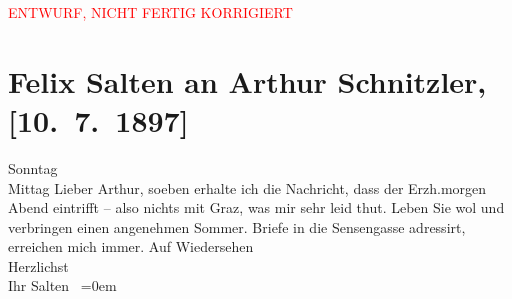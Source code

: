 
\begin{center}
            \textcolor{red}{ENTWURF, NICHT FERTIG KORRIGIERT}
                      \end{center}
            
         
         \renewcommand{\erwaehntePersonen}{Personen: Leopold Ferdinand Salvator Wölfling}
         \renewcommand{\erwaehnteOrte}{Orte: Graz, Sensengasse, Wien}
         \renewcommand{\erwaehnteWerke}{}
               \section[Felix Salten an Arthur Schnitzler, {[}10. 7. 1897{]}]{ Felix Salten an Arthur Schnitzler, {[}10. 7. 1897{]}}\nopagebreak{}\rehead{ }\begin{ledgroupsized}[t]{13cm}\normalsize\beginnumbering \toendnotes[C]{\smallbreak\pagebreak[2]} 
\toendnotes[C]{\smallbreak}\pstart
           \raggedleft{}{\pb}Sonntag{\\}Mittag\pend
           \pstart
           Lieber Arthur, soeben erhalte ich die Nachricht, dass der Erzh.morgen Abend eintrifft – also nichts mit Graz, was mir sehr leid thut. Leben Sie wol und verbringen einen angenehmen
               Sommer. Briefe in die Sensengasse adressirt,
               erreichen mich immer.\pend
           \pstart
           Auf Wiedersehen {\\[\baselineskip]}Herzlichst {\\[\baselineskip]}Ihr \spacefill\mbox{Salten }\pend
           \leftskip=0em{}
         
         \endnumbering{}\end{ledgroupsized}\begin{anhang}\end{anhang}\newcommand{\dateiname}{L03279}\newcommand{\titel}{Felix Salten an Arthur Schnitzler, [10. 7. 1897]}\newcommand{\editorInnen}{Martin Anton Müller und Laura Untner}
      